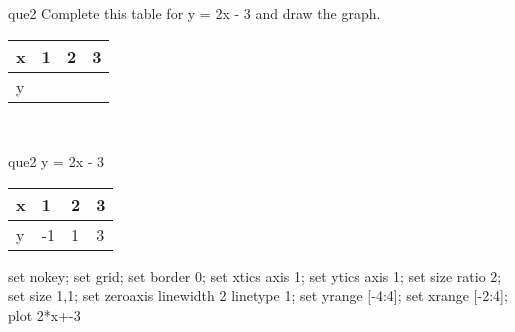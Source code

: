 \documentclass[13.5pt, varwidth=true]{beamer}
\begin{document}
\begin{frame}[shrink=19,fragile]
	\begin{beamercolorbox}[rounded=true, left, shadow=true,wd=14.8cm]{que2}
		 Complete this table for y = 2x - 3 and draw the graph. \\[0.3cm] \renewcommand{\arraystretch}{1.2}\begin{tabular}{|C|C|C|C|} \hline x & 1 & 2 & 3 \\ \hline y & & & \\ \hline \end{tabular}\\[0.3cm]
	\end{beamercolorbox}
\end{frame}
\begin{frame}[shrink=19,fragile]
	\begin{beamercolorbox}[rounded=true, left, shadow=true,wd=14.8cm]{que2}
		y = 2x - 3\renewcommand{\arraystretch}{1.2}\begin{tabular}{|C|C|C|C|} \hline x & 1 & 2 & 3 \\ \hline y & -1 & 1 & 3\\ \hline \end{tabular}\begin{gnuplot}[terminal=pdf] set nokey; set grid; set border 0; set xtics axis 1; set ytics axis 1; set size ratio 2; set size 1,1; set zeroaxis linewidth 2 linetype 1; set yrange [-4:4]; set xrange [-2:4]; plot 2*x+-3 \end{gnuplot}
	\end{beamercolorbox}
\end{frame}
\end{document}
